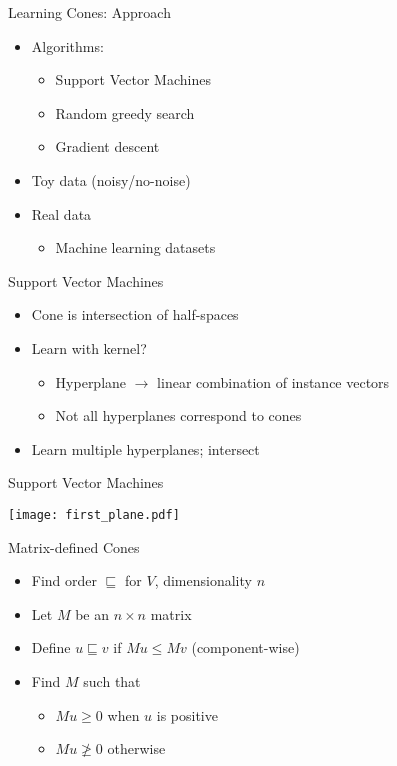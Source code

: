 \documentclass{beamer}
\newlength{\wideitemsep}
\let\olditem\item
\renewcommand{\item}{\setlength{\itemsep}{\wideitemsep}\olditem}
\begin{document}
\begin{frame}{Learning Cones: Approach}
\begin{itemize}
\item Algorithms:
\begin{itemize}
\item Support Vector Machines
\item Random greedy search
\item Gradient descent
\end{itemize}
\item Toy data (noisy/no-noise)
\item Real data
\begin{itemize}
\item Machine learning datasets
\end{itemize}
\end{itemize}
\end{frame}

\begin{frame}{Support Vector Machines}
\begin{itemize}
\item Cone is intersection of half-spaces
\item Learn with kernel?
\begin{itemize}
\item Hyperplane $\rightarrow$ linear combination of instance vectors
\item Not all hyperplanes correspond to cones
\end{itemize}
\item Learn multiple hyperplanes; intersect
\end{itemize}
\end{frame}

\begin{frame}{Support Vector Machines}
\begin{center}
\texttt{[image: first\_plane.pdf]}
\end{center}
\end{frame}


\begin{frame}{Matrix-defined Cones}
\begin{itemize}
\item Find order $\sqsubseteq$ for $V$, dimensionality $n$
\item Let $M$ be an $n\times n$ matrix
\item Define $u \sqsubseteq v$ if $Mu \le Mv$ (component-wise)
\item Find $M$ such that
\begin{itemize}
\item $Mu \ge 0$ when $u$ is positive
\item $Mu \ngeq 0$ otherwise
\end{itemize}
\end{itemize}
\end{frame}
\end{document}
